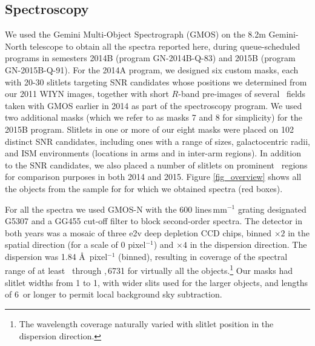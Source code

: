
\subsection{Spectroscopy}


We used the Gemini Multi-Object Spectrograph (GMOS) on the 8.2m Gemini-North telescope to obtain all the spectra reported here, during queue-scheduled programs in semesters 2014B (program GN-2014B-Q-83) and 2015B (program GN-2015B-Q-91).  %
For the 2014A program, we designed six custom masks, each with 20-30 slitlets targeting SNR candidates whose positions we determined from our 2011 WIYN images, together with  short $R$-band pre-images of several \gal\ fields taken with GMOS earlier in 2014 as part of the spectroscopy program.    
We used two additional masks (which we refer to as masks 7 and 8 for simplicity)  for the 2015B program.
 Slitlets in one or more of our eight masks were placed on 102 distinct SNR candidates, including ones with a range of sizes, galactocentric radii, and ISM environments (locations in arms and in 
 inter-arm regions).  In addition to the SNR candidates, we also placed a number of slitlets on prominent \hii\ regions  for comparison purposes in both 2014 and 2015.
Figure \ref{fig_overview} shows all the objects from the sample for for which we obtained spectra (red boxes).  %


For all the spectra we used GMOS-N with the 600 lines\,mm$^{-1}$ grating designated G5307 and a GG455 cut-off filter to block second-order spectra.   The detector in both years was a mosaic of three e2v deep depletion CCD chips, binned $\times 2$ in the spatial direction (for a scale of 0 pixel$^{-1}$) and $\times 4$ in the dispersion direction.  
The dispersion was 1.84 \AA\,  pixel$^{-1}$ (binned), resulting in coverage of the spectral range of at least \hb\ through \sii{},\,6731 for virtually all the objects.\footnote{The wavelength coverage naturally varied with slitlet position in the dispersion direction.}  Our  masks had  slitlet  widths from 1 to 1, with wider slits used for the larger objects, and lengths of 6\arcsec\ or longer to permit local background sky subtraction.   

